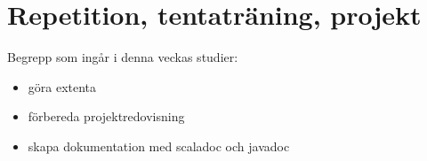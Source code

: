 \chapter{Repetition, tentaträning, projekt}\label{chapter:W13}
Begrepp som ingår i denna veckas studier:
\begin{itemize}[noitemsep,label={$\square$},leftmargin=*]
\item göra extenta
\item förbereda projektredovisning
\item skapa dokumentation med scaladoc och javadoc\end{itemize}
